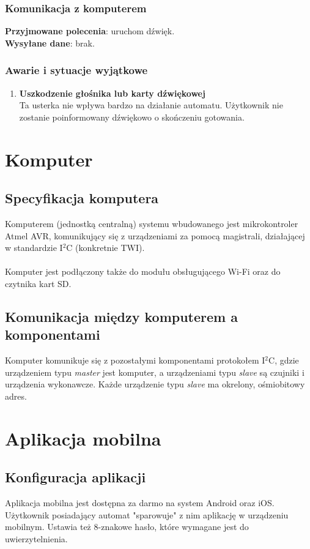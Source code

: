 \documentclass[12pt,a4paper,notitlepage]{article}
\begin{document}
\subsubsection{Komunikacja z komputerem}
\textbf{Przyjmowane polecenia}: uruchom dźwięk.\\
\textbf{Wysyłane dane}: brak.

\subsubsection{Awarie i sytuacje wyjątkowe}
\begin{enumerate}
  \item \textbf{Uszkodzenie głośnika lub karty dźwiękowej}\\
Ta usterka nie wpływa bardzo na działanie automatu. Użytkownik nie zostanie poinformowany dźwiękowo o skończeniu gotowania.
\end{enumerate}

\section{Komputer}

\subsection{Specyfikacja komputera}

Komputerem (jednostką centralną) systemu wbudowanego jest mikrokontroler Atmel AVR, komunikujący się z urządzeniami za pomocą magistrali, działającej w standardzie I$^2$C (konkretnie TWI). \\ \\
Komputer jest podłączony także do modułu obsługującego Wi-Fi oraz do czytnika kart SD. 

\subsection{Komunikacja między komputerem a komponentami}
Komputer komunikuje się z pozostałymi komponentami protokołem I$^2$C, gdzie urządzeniem typu \emph{master} jest komputer, a urządzeniami typu \emph{slave} są czujniki i urządzenia wykonawcze. Każde urządzenie typu \emph{slave} ma okrelony, ośmiobitowy adres. 

\section{Aplikacja mobilna}
\subsection{Konfiguracja aplikacji}
Aplikacja mobilna jest dostępna za darmo na system Android oraz iOS. Użytkownik posiadający automat "sparowuje" z nim aplikację w urządzeniu mobilnym. Ustawia też 8-znakowe hasło, które wymagane jest do uwierzytelnienia.
\end{document}
